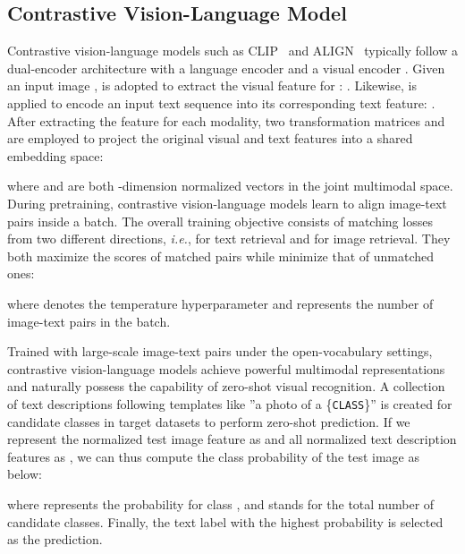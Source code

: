 \documentclass[10pt,twocolumn,letterpaper]{article}
\begin{document}
\subsection{Contrastive Vision-Language Model}
Contrastive vision-language models such as CLIP~\cite{radford2021learning} and ALIGN~\cite{jia2021scaling} typically follow a dual-encoder architecture with a language encoder  and a visual encoder .
Given an input image ,  is adopted to extract the visual feature for : . Likewise,  is applied to encode an input text sequence  into its corresponding text feature: . After extracting the feature for each modality, two transformation matrices  and  are employed to project the original visual and text features into a shared embedding space: 

where  and  are both -dimension normalized vectors in the joint multimodal space.
During pretraining, contrastive vision-language models learn to align image-text pairs inside a batch. The overall training objective consists of matching losses from two different directions, \emph{i.e.},  for text retrieval and  for image retrieval. They both maximize the scores of matched pairs while minimize that of unmatched ones:

where  denotes the temperature hyperparameter and  represents the number of image-text pairs in the batch.

Trained with large-scale image-text pairs under the open-vocabulary settings, contrastive vision-language models achieve powerful multimodal representations and naturally possess the capability of zero-shot visual recognition. A collection of text descriptions following templates like ''a photo of a \{\texttt{CLASS}\}'' is created for candidate classes in target datasets to perform zero-shot prediction. If we represent the normalized test image feature as  and all normalized text description features as , we can thus compute the class probability of the test image as below:

where  represents the probability for class , and  stands for the total number of candidate classes. Finally, the text label with the highest probability is selected as the prediction.
\end{document}
